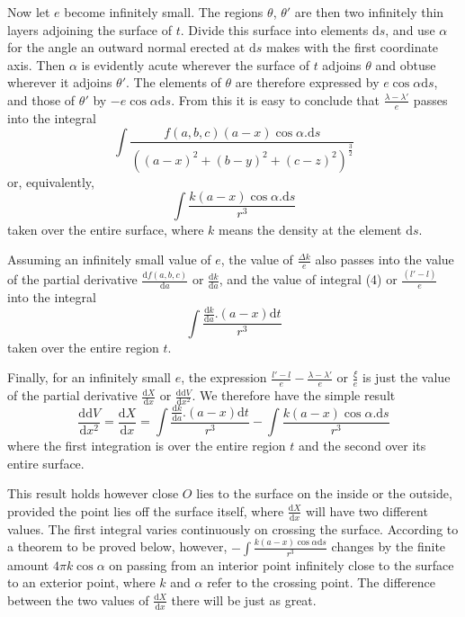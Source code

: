 Now let $e$ become infinitely small. The regions $\theta$, $\theta'$ are then two infinitely thin layers adjoining the surface of $t$. Divide this surface into elements $\mathrm{d}s$, and use $\alpha$ for the angle an outward normal erected at $\mathrm{d}s$ makes with the first coordinate axis. Then $\alpha$ is evidently acute wherever the surface of $t$ adjoins $\theta$ and obtuse wherever it adjoins $\theta'$. The elements of $\theta$ are therefore expressed by $e\cos\alpha\mathrm{d}s$, and those of $\theta'$ by $-e\cos\alpha\mathrm{d}s$. From this it is easy to conclude that $\frac{\lambda-\lambda'}{e}$ passes into the integral
\[
\int\frac{f(a,b,c)(a-x)\cos\alpha.\mathrm{d}s}{((a-x)^2+(b-y)^2+(c-z)^2)^{\frac{3}{2}}}
\]
or, equivalently,
\[
\int\frac{k(a-x)\cos\alpha.\mathrm{d}s}{r^3}
\]
taken over the entire surface, where $k$ means the density at the element $\mathrm{d}s$.

Assuming an infinitely small value of $e$, the value of $\frac{\Delta k}{e}$ also passes into the value of the partial derivative $\frac{\mathrm{d}f(a,b,c)}{\mathrm{d}a}$ or $\frac{\mathrm{d}k}{\mathrm{d}a}$, and the value of integral (4) or $\frac{(l'-l)}{e}$ into the integral
%
\[
\int\frac{\frac{\mathrm{d}k}{\mathrm{d}a}.(a-x)\mathrm{d}t}{r^3}
\]
taken over the entire region $t$.

Finally, for an infinitely small $e$, the expression $\frac{l'-l}{e}-\frac{\lambda-\lambda'}{e}$ or $\frac{\xi}{e}$ is just the value of the partial derivative $\frac{\mathrm{d}X}{\mathrm{d}x}$ or $\frac{\mathrm{d}\mathrm{d}V}{\mathrm{d}x^2}$. We therefore have the simple result
\[
\frac{\mathrm{d}\mathrm{d}V}{\mathrm{d}x^2}=\frac{\mathrm{d}X}{\mathrm{d}x}=\int\frac{\frac{\mathrm{d}k}{\mathrm{d}a}.(a-x)\mathrm{d}t}{r^3}-\int\frac{k(a-x)\cos\alpha.\mathrm{d}s}{r^3}
\]
where the first integration is over the entire region $t$ and the second over its entire surface.

This result holds however close $O$ lies to the surface on the inside or the outside, provided the point lies off the surface itself, where $\frac{\mathrm{d}X}{\mathrm{d}x}$ will have two different values. The first integral varies continuously on crossing the surface. According to a theorem to be proved below, however, $-\int\frac{k(a-x)\cos\alpha\mathrm{d}s}{r^3}$ changes by the finite amount $4\pi k\cos\alpha$ on passing from an interior point infinitely close to the surface to an exterior point, where $k$ and $\alpha$ refer to the crossing point. The difference between the two values of $\frac{\mathrm{d}X}{\mathrm{d}x}$ there will be just as great.

